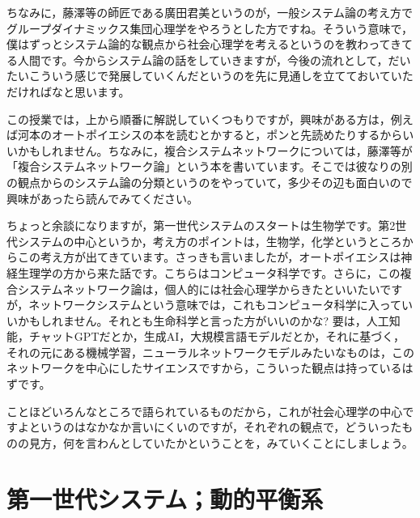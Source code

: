 \documentclass{ltjsbook}
\begin{document}
ちなみに，藤澤等の師匠である廣田君美というのが，一般システム論の考え方でグループダイナミックス集団心理学をやろうとした方ですね。そういう意味で，僕はずっとシステム論的な観点から社会心理学を考えるというのを教わってきてる人間です。今からシステム論の話をしていきますが，今後の流れとして，だいたいこういう感じで発展していくんだというのを先に見通しを立てておいていただければなと思います。

この授業では，上から順番に解説していくつもりですが，興味がある方は，例えば河本のオートポイエシスの本\parencite{KawamotoHideo}を読むとかすると，ポンと先読めたりするからいいかもしれません。ちなみに，複合システムネットワークについては，藤澤等が「複合システムネットワーク論」\parencite{fujisawaNetwork}という本を書いています。そこでは彼なりの別の観点からのシステム論の分類というのをやっていて，多少その辺も面白いので興味があったら読んでみてください。

ちょっと余談になりますが，第一世代システムのスタートは生物学です。第2世代システムの中心というか，考え方のポイントは，生物学，化学というところからこの考え方が出てきています。さっきも言いましたが，オートポイエシスは神経生理学の方から来た話です。こちらはコンピュータ科学です。さらに，この複合システムネットワーク論は，個人的には社会心理学からきたといいたいですが，ネットワークシステムという意味では，これもコンピュータ科学に入っていいかもしれません。それとも生命科学と言った方がいいのかな? 要は，人工知能，チャットGPTだとか，生成AI，大規模言語モデルだとか，それに基づく，それの元にある機械学習，ニューラルネットワークモデルみたいなものは，このネットワークを中心にしたサイエンスですから，こういった観点は持っているはずです。

ことほどいろんなところで語られているものだから，これが社会心理学の中心ですよというのはなかなか言いにくいのですが，それぞれの観点で，どういったものの見方，何を言わんとしていたかということを，みていくことにしましょう。

\section{第一世代システム；動的平衡系}
\end{document}
